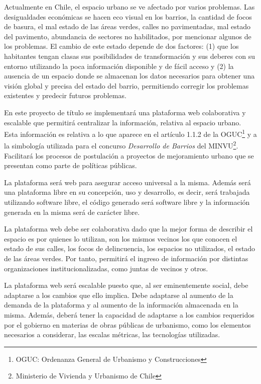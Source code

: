 \documentclass[12pt]{article}
\begin{document}
Actualmente en Chile, el espacio urbano se ve afectado por varios problemas. Las
desigualdades económicas se hacen eco visual en los barrios, la cantidad de
focos de basura, el mal estado de las áreas verdes, calles no pavimentadas, mal
estado del pavimento, abundancia de sectores no habilitados, por mencionar
algunos de los problemas. 
El cambio de este estado depende de dos factores: (1)
que los habitantes tengan clasas
sus posibilidades de transformación y sus deberes con su entorno utilizando la
poca información disponible y de fácil acceso y (2) la
ausencia de un espacio donde se almacenan los datos necesarios para obtener una visión
global y precisa del estado del barrio, permitiendo corregir los problemas
existentes y predecir futuros problemas.\cite{L01}

En este proyecto de título se implementará una plataforma web colaborativa y
escalable que permitirá centralizar la información, relativa al espacio urbano.
Esta información es relativa a lo que aparece en el artículo 1.1.2 de la
OGUC\footnote{OGUC: Ordenanza General de Urbanismo y Construcciones} y a la
simbología utilizada para el concurso \emph{Desarrollo de Barrios} del
MINVU\footnote{Ministerio de Vivienda y Urbanismo de Chile}. 
Facilitará los procesos de postulación a proyectos de mejoramiento
urbano que se presentan como parte de políticas públicas.

La plataforma será web para asegurar acceso universal a la misma. Además será
una plataforma libre en su concepción, uso y desarrollo, es decir, será
trabajada utilizando software libre, el código generado será software libre y la
información generada en la misma será de carácter libre.

La plataforma web debe ser colaborativa dado que la mejor forma de describir el
espacio es por quienes lo utilizan, son los mismos vecinos los que conocen el
estado de sus calles, los focos de delincuencia, los espacios no utilizados, el
estado de las áreas verdes. Por tanto, permitirá el ingreso de información por
distintas organizaciones institucionalizadas, como juntas de vecinos y otros.

La plataforma web será escalable puesto que, al ser eminentemente social, debe
adaptarse a los cambios que ello implica. Debe adaptarse al aumento de la
demanda de la plataforma y al aumento de la información almacenada en la misma.
Además, deberá tener la capacidad de adaptarse a los cambios requeridos por el
gobierno en materias de obras públicas de urbanismo, como los elementos
necesarios a considerar, las escalas métricas, las tecnologías utilizadas.
\end{document}

